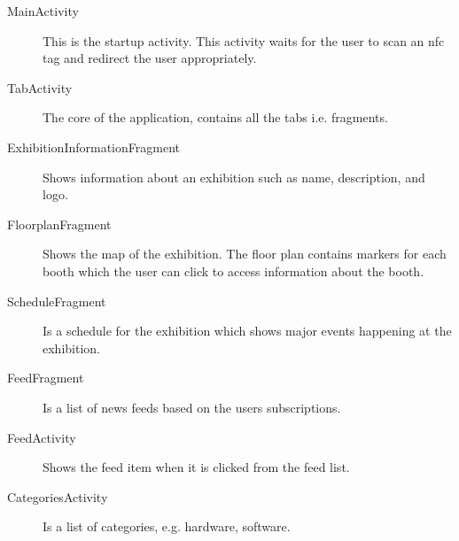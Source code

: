 \begin{description}
\item[MainActivity] This is the startup activity. This activity waits for the user to scan an \ac{nfc} tag and redirect the user appropriately.
\item[TabActivity] The core of the application, contains all the tabs i.e. fragments.
\item[ExhibitionInformationFragment] Shows information about an exhibition such as name, description, and logo.
\item[FloorplanFragment] Shows the map of the exhibition. The floor plan contains markers for each booth which the user can click to access information about the booth.
\item[ScheduleFragment] Is a schedule for the exhibition which shows major events happening at the exhibition.
\item[FeedFragment] Is a list of news feeds based on the users subscriptions.
\item[FeedActivity] Shows the feed item when it is clicked from the feed list.
\item[CategoriesActivity] Is a list of categories, e.g. hardware, software.
\end{description}

